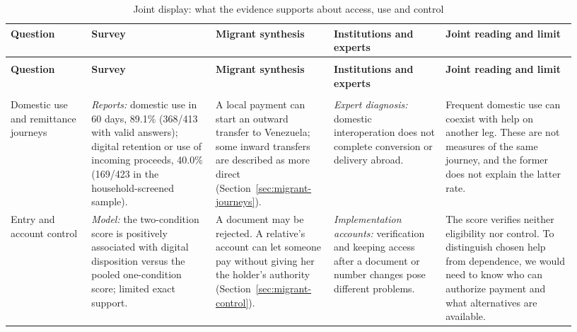 \begin{singlespace}
\small
\setlength{\tabcolsep}{3.5pt}
\begin{longtable}{@{}
  >{\raggedright\arraybackslash}p{0.138\linewidth}
  >{\raggedright\arraybackslash}p{0.203\linewidth}
  >{\raggedright\arraybackslash}p{0.199\linewidth}
  >{\raggedright\arraybackslash}p{0.180\linewidth}
  >{\raggedright\arraybackslash}p{0.213\linewidth}@{}}
\caption{Joint display: what the evidence supports about access, use and control}
\label{tab:joint-evidence}\\
\toprule
\textbf{Question} & \textbf{Survey} & \textbf{Migrant synthesis} & \textbf{Institutions and experts} & \textbf{Joint reading and limit} \\
\midrule
\endfirsthead
\multicolumn{5}{@{}l}{\footnotesize Table~\thetable\ (continued)}\\
\toprule
\textbf{Question} & \textbf{Survey} & \textbf{Migrant synthesis} & \textbf{Institutions and experts} & \textbf{Joint reading and limit} \\
\midrule
\endhead
\midrule
\multicolumn{5}{r@{}}{\footnotesize Continued on next page}\\
\endfoot
\bottomrule
\endlastfoot
Domestic use and remittance journeys
& \textit{Reports:} domestic use in 60 days, 89.1\% (368/413 with valid answers); digital retention or use of incoming proceeds, 40.0\% (169/423 in the household-screened sample).
& A local payment can start an outward transfer to Venezuela; some inward transfers are described as more direct (Section~\ref{sec:migrant-journeys}).
& \textit{Expert diagnosis:} domestic interoperation does not complete conversion or delivery abroad.
& Frequent domestic use can coexist with help on another leg. These are not measures of the same journey, and the former does not explain the latter rate. \\
\addlinespace
Entry and account control
& \textit{Model:} the two-condition score is positively associated with digital disposition versus the pooled one-condition score; limited exact support.
& A document may be rejected. A relative's account can let someone pay without giving her the holder's authority (Section~\ref{sec:migrant-control}).
& \textit{Implementation accounts:} verification and keeping access after a document or number changes pose different problems.
& The score verifies neither eligibility nor control. To distinguish chosen help from dependence, we would need to know who can authorize payment and what alternatives are available. \\

\end{longtable}
\end{singlespace}
